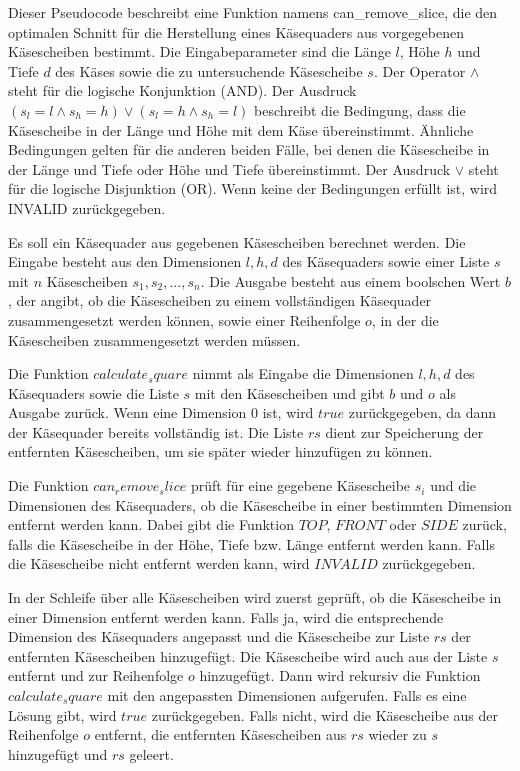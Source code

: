 \documentclass[a4paper,10pt,ngerman]{scrartcl}
\begin{document}
    Dieser Pseudocode beschreibt eine Funktion namens can_remove_slice, die den optimalen Schnitt für die Herstellung eines Käsequaders aus vorgegebenen Käsescheiben bestimmt.
    Die Eingabeparameter sind die Länge $l$, Höhe $h$ und Tiefe $d$ des Käses sowie die zu untersuchende Käsescheibe $s$.
    Der Operator $\land$ steht für die logische Konjunktion (AND). Der Ausdruck $(s_l = l \land s_h = h) \lor (s_l = h \land s_h = l)$ beschreibt die Bedingung,
    dass die Käsescheibe in der Länge und Höhe mit dem Käse übereinstimmt.
    Ähnliche Bedingungen gelten für die anderen beiden Fälle, bei denen die Käsescheibe in der Länge und Tiefe oder Höhe und Tiefe übereinstimmt.
    Der Ausdruck $\lor$ steht für die logische Disjunktion (OR). Wenn keine der Bedingungen erfüllt ist, wird INVALID zurückgegeben.

    Es soll ein Käsequader aus gegebenen Käsescheiben berechnet werden.
    Die Eingabe besteht aus den Dimensionen $l, h, d$ des Käsequaders sowie einer Liste $s$ mit $n$ Käsescheiben $s_1, s_2, ..., s_n$.
    Die Ausgabe besteht aus einem boolschen Wert $b$, der angibt, ob die Käsescheiben zu einem vollständigen Käsequader zusammengesetzt werden können,
    sowie einer Reihenfolge $o$, in der die Käsescheiben zusammengesetzt werden müssen.

    Die Funktion $calculate_square$ nimmt als Eingabe die Dimensionen $l, h, d$ des Käsequaders sowie die Liste $s$ mit den Käsescheiben und gibt $b$ und $o$ als Ausgabe zurück.
    Wenn eine Dimension $0$ ist, wird $true$ zurückgegeben, da dann der Käsequader bereits vollständig ist.
    Die Liste $rs$ dient zur Speicherung der entfernten Käsescheiben, um sie später wieder hinzufügen zu können.

    Die Funktion $can_remove_slice$ prüft für eine gegebene Käsescheibe $s_i$ und die Dimensionen des Käsequaders, ob die Käsescheibe in einer bestimmten Dimension entfernt werden kann.
    Dabei gibt die Funktion $TOP$, $FRONT$ oder $SIDE$ zurück, falls die Käsescheibe in der Höhe,
    Tiefe bzw. Länge entfernt werden kann. Falls die Käsescheibe nicht entfernt werden kann, wird $INVALID$ zurückgegeben.

    In der Schleife über alle Käsescheiben wird zuerst geprüft, ob die Käsescheibe in einer Dimension entfernt werden kann.
    Falls ja, wird die entsprechende Dimension des Käsequaders angepasst und die Käsescheibe zur Liste $rs$ der entfernten Käsescheiben hinzugefügt.
    Die Käsescheibe wird auch aus der Liste $s$ entfernt und zur Reihenfolge $o$ hinzugefügt.
    Dann wird rekursiv die Funktion $calculate_square$ mit den angepassten Dimensionen aufgerufen.
    Falls es eine Lösung gibt, wird $true$ zurückgegeben.
    Falls nicht, wird die Käsescheibe aus der Reihenfolge $o$ entfernt, die entfernten Käsescheiben aus $rs$ wieder zu $s$ hinzugefügt und $rs$ geleert.
\end{document}
